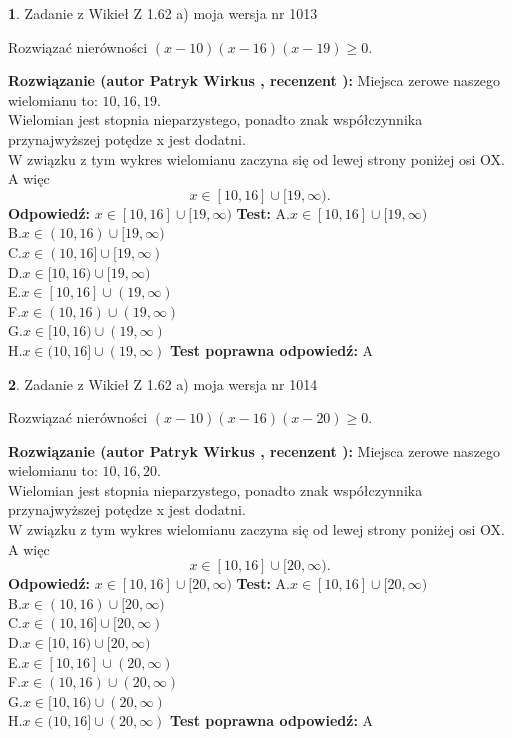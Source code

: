 \documentclass[12pt, a4paper]{article}
\theoremstyle{definition} %
\newtheorem{zad}{}
\newcommand{\zadStart}[1]{\begin{zad}#1\newline}
\newcommand{\zadStop}{\end{zad}}
\newcommand{\rozwStart}[2]{\noindent \textbf{Rozwiązanie (autor #1 , recenzent #2): }\newline}
\newcommand{\rozwStop}{\newline}
\newcommand{\odpStart}{\noindent \textbf{Odpowiedź:}\newline}
\newcommand{\odpStop}{\newline}
\newcommand{\testStart}{\noindent \textbf{Test:}\newline}
\newcommand{\testStop}{\newline}
\newcommand{\kluczStart}{\noindent \textbf{Test poprawna odpowiedź:}\newline}
\newcommand{\kluczStop}{\newline}
\begin{document}
\zadStart{Zadanie z Wikieł Z 1.62 a) moja wersja nr 1013}

Rozwiązać nierówności $(x-10)(x-16)(x-19)\ge0$.
\zadStop
\rozwStart{Patryk Wirkus}{}
Miejsca zerowe naszego wielomianu to: $10, 16, 19$.\\
Wielomian jest stopnia nieparzystego, ponadto znak współczynnika przy\linebreak najwyższej potędze x jest dodatni.\\ W związku z tym wykres wielomianu zaczyna się od lewej strony poniżej osi OX. A więc $$x \in [10,16] \cup [19,\infty).$$
\rozwStop
\odpStart
$x \in [10,16] \cup [19,\infty)$
\odpStop
\testStart
A.$x \in [10,16] \cup [19,\infty)$\\
B.$x \in (10,16) \cup [19,\infty)$\\
C.$x \in (10,16] \cup [19,\infty)$\\
D.$x \in [10,16) \cup [19,\infty)$\\
E.$x \in [10,16] \cup (19,\infty)$\\
F.$x \in (10,16) \cup (19,\infty)$\\
G.$x \in [10,16) \cup (19,\infty)$\\
H.$x \in (10,16] \cup (19,\infty)$
\testStop
\kluczStart
A
\kluczStop



\zadStart{Zadanie z Wikieł Z 1.62 a) moja wersja nr 1014}

Rozwiązać nierówności $(x-10)(x-16)(x-20)\ge0$.
\zadStop
\rozwStart{Patryk Wirkus}{}
Miejsca zerowe naszego wielomianu to: $10, 16, 20$.\\
Wielomian jest stopnia nieparzystego, ponadto znak współczynnika przy\linebreak najwyższej potędze x jest dodatni.\\ W związku z tym wykres wielomianu zaczyna się od lewej strony poniżej osi OX. A więc $$x \in [10,16] \cup [20,\infty).$$
\rozwStop
\odpStart
$x \in [10,16] \cup [20,\infty)$
\odpStop
\testStart
A.$x \in [10,16] \cup [20,\infty)$\\
B.$x \in (10,16) \cup [20,\infty)$\\
C.$x \in (10,16] \cup [20,\infty)$\\
D.$x \in [10,16) \cup [20,\infty)$\\
E.$x \in [10,16] \cup (20,\infty)$\\
F.$x \in (10,16) \cup (20,\infty)$\\
G.$x \in [10,16) \cup (20,\infty)$\\
H.$x \in (10,16] \cup (20,\infty)$
\testStop
\kluczStart
A
\kluczStop
\end{document}
